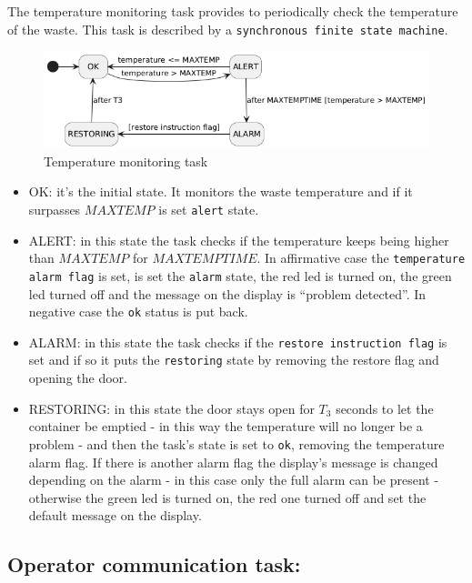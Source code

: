 \documentclass[a4paper,12pt]{report}
\begin{document}
            The temperature monitoring task provides to periodically check the temperature of the waste.
            This task is described by a \texttt{synchronous finite state machine}. 

            \begin{figure}[H]
        	\centering{}
                \includegraphics[width=\textwidth]{img/temperature_task.png}
        	\caption{Temperature monitoring task}
        	\label{img:temperature_task}
            \end{figure}

            \begin{itemize}
                \item OK: it's the initial state. It monitors the waste temperature and if it surpasses $MAXTEMP$ is set \texttt{alert} state. 
                \item ALERT: in this state the task checks if the temperature keeps being higher than $MAXTEMP$ for $MAXTEMPTIME$. In affirmative case the \texttt{temperature alarm flag} is set, is set the \texttt{alarm} state, the red led is turned on, the green led turned off and the message on the display is ``problem detected''. In negative case the \texttt{ok} status is put back.
                \item ALARM: in this state the task checks if the \texttt{restore instruction flag} is set and if so it puts the \texttt{restoring} state by removing the restore flag and opening the door.
                \item RESTORING: in this state the door stays open for $T_3$ seconds to let the container be emptied - in this way the temperature will no longer be a problem - and then the task's state is set to \texttt{ok}, removing the temperature alarm flag. If there is another alarm flag the display's message is changed depending on the alarm - in this case only the full alarm can be present - otherwise the green led is turned on, the red one turned off and set the default message on the display.
            \end{itemize}

        \subsection{Operator communication task:}
\end{document}
